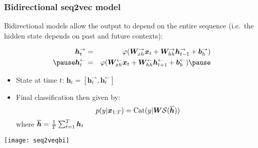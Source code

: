 \documentclass[smaller]{beamer}
\begin{document}
\begin{frame}
  \frametitle{Bidirectional seq2vec model}

  Bidirectional models allow the output to depend on the entire sequence (i.e.\ the hidden state depends on past and future contexts): \pe
  
  \begin{eqnarray}
    \bm h_{t}^{\to} &=& \varphi(\bm W_{xh}^{\to}\bm x_{t} + \bm W_{hh}^{\to}\bm h_{t-1}^{\to} + \bm b_{h}^{\to})\\\pe
    \bm h_{t}^{\leftarrow} &=& \varphi(\bm W_{xh}^{\leftarrow}\bm x_{t} + \bm W_{hh}^{\leftarrow}\bm h_{t+1}^{\leftarrow} + \bm b_{h}^{\leftarrow})\pe
  \end{eqnarray}
  \pe
  \begin{itemize}
  \item State at time $t$: $\bm h_{t} = [\bm h_{t}^{\to},\bm h_{t}^{\leftarrow}]$ \pe
  \item Final classification then given by: \pe
    \begin{equation}
      p(y|\bm x_{1:T}) = \text{Cat}(y|\bm W\mathcal{S}(\overline{\bm h}))
    \end{equation}
    \pe
    where $\overline{\bm h} = \frac1T\sum_{t=1}^{T}\bm h_{t}$
  \end{itemize}
  \pe
  
    \begin{center}
    \texttt{[image: seq2veqbi]}

  \end{center}
  
\end{frame}
\end{document}
